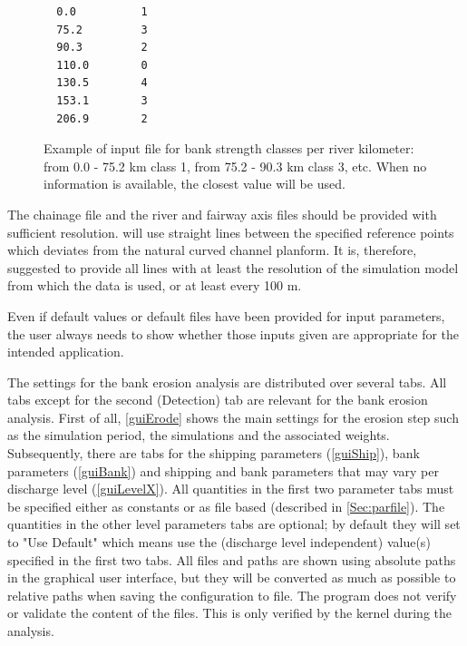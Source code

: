 \begin{figure}[!hb]

\begin{Verbatim}
  0.0          1
  75.2         3
  90.3         2
  110.0        0
  130.5        4
  153.1        3
  206.9        2
\end{Verbatim}
\caption{Example of input file for bank strength classes per river kilometer: from 0.0 - 75.2 km class 1, from 75.2 - 90.3 km class 3, etc.
When no information is available, the closest value will be used.}
\label{Fig2.3}
\end{figure}

\clearpage
\Note The chainage file and the river and fairway axis files should be provided with sufficient resolution.
\dfastbe will use straight lines between the specified reference points which deviates from the natural curved channel planform.
It is, therefore, suggested to provide all lines with at least the resolution of the simulation model from which the data is used, or at least every 100 m.

\Note Even if default values or default files have been provided for input parameters, the user always needs to show whether those inputs given are appropriate for the intended application.

The settings for the bank erosion analysis are distributed over several tabs.
All tabs except for the second (Detection) tab are relevant for the bank erosion analysis.
First of all, \autoref{guiErode} shows the main settings for the erosion step such as the simulation period, the simulations and the associated weights.
Subsequently, there are tabs for the shipping parameters (\autoref{guiShip}), bank parameters (\autoref{guiBank}) and shipping and bank parameters that may vary per discharge level (\autoref{guiLevelX}).
All quantities in the first two parameter tabs must be specified either as constants or as file based (described in \autoref{Sec:parfile}).
The quantities in the other level parameters tabs are optional; by default they will set to "Use Default" which means use the (discharge level independent) value(s) specified in the first two tabs.
All files and paths are shown using absolute paths in the graphical user interface, but they will be converted as much as possible to relative paths when saving the configuration to file.
The program does not verify or validate the content of the files.
This is only verified by the kernel during the analysis.

